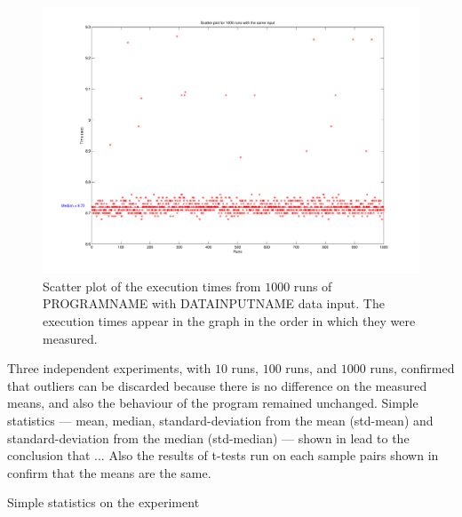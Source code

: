 \begin{figure}
  \centering
  \includegraphics[width=1.00\linewidth]{Figures/nt1000}
  \caption{Scatter plot of the execution times from $1000$ runs of PROGRAMNAME with DATAINPUTNAME  data input. The execution times appear in the graph in the order in which they were measured.}
  \label{fig:gauss}
\end{figure}

Three independent experiments, with $10$ runs, $100$ runs, and $1000$ runs, confirmed that outliers can be discarded because there is no difference on the measured means, and also the behaviour of the program remained unchanged. 
Simple statistics --- mean, median, standard-deviation from the mean (std-mean) and standard-deviation from the median (std-median) --- shown in  lead to the conclusion that ... 
 Also the results of t-tests run on each sample pairs  shown in  confirm that the means are the same.

\begin{table}
  \centering
  \begin{tiny}
  
  \end{tiny}
  \caption{Simple statistics on the experiment}
  \label{tab:robustTest}
\end{table}


